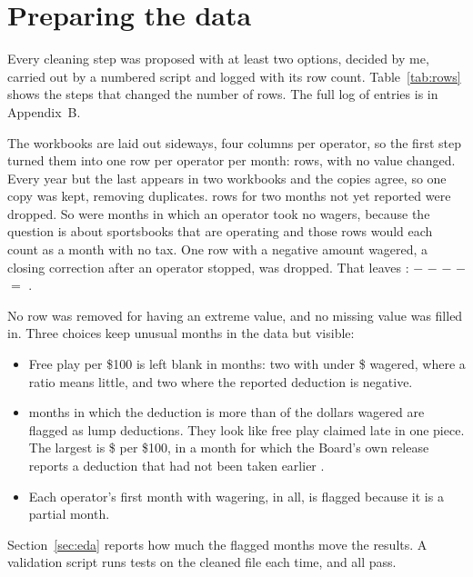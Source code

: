 \section{Preparing the data}

Every cleaning step was proposed with at least two options, decided by me, carried out by a numbered script and logged with its row count. Table~\ref{tab:rows} shows the steps that changed the number of rows. The full log of  entries is in Appendix~B.

\begin{table}[H]
\centering\small
\caption{Row accounting. Source: wrangling log (Appendix B).}\label{tab:rows}

\end{table}

The workbooks are laid out sideways, four columns per operator, so the first step turned them into one row per operator per month:  rows, with no value changed. Every year but the last appears in two workbooks and the copies agree, so one copy was kept, removing  duplicates.  rows for two months not yet reported were dropped. So were  months in which an operator took no wagers, because the question is about sportsbooks that are operating and those rows would each count as a month with no tax. One row with a negative amount wagered, a closing correction after an operator stopped, was dropped. That leaves :  $-$  $-$  $-$  $-$  $=$ .

No row was removed for having an extreme value, and no missing value was filled in. Three choices keep unusual months in the data but visible:

\begin{itemize}
\item Free play per \$100 is left blank in  months: two with under \$ wagered, where a ratio means little, and two where the reported deduction is negative.
\item {} months in which the deduction is more than  of the dollars wagered are flagged as lump deductions. They look like free play claimed late in one piece. The largest is \$ per \$100, in a month for which the Board's own release reports a deduction that had not been taken earlier \cite{mgcb_release_2024}.
\item Each operator's first month with wagering,  in all, is flagged because it is a partial month.
\end{itemize}

Section~\ref{sec:eda} reports how much the flagged months move the results. A validation script runs  tests on the cleaned file each time, and all pass.
